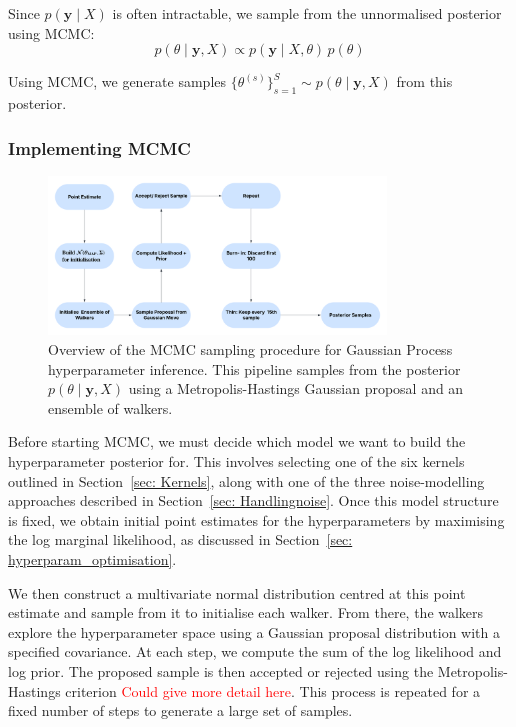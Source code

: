 \documentclass{article}
\begin{document}
\noindent
Since \( p(\mathbf{y} \mid X) \) is often intractable, we sample from the unnormalised posterior using MCMC:
\[
p(\theta \mid \mathbf{y}, X) \propto p(\mathbf{y} \mid X, \theta) \, p(\theta)
\]

\noindent
Using MCMC, we generate samples \( \{\theta^{(s)}\}_{s=1}^S \sim p(\theta \mid \mathbf{y}, X) \) from this posterior.


\subsubsection*{Implementing MCMC}
\begin{figure}[H]
    \centering
    \includegraphics[width=0.8\textwidth]{LatexPlots/MCMC_Flow.png}
    \caption{Overview of the MCMC sampling procedure for Gaussian Process hyperparameter inference.
     This pipeline samples from the posterior \( p(\theta \mid \mathbf{y}, X) \) using a Metropolis-Hastings Gaussian proposal and an ensemble of walkers.}
    \label{fig:MCMC flowchart}
\end{figure}

\noindent
Before starting MCMC, we must decide which model we want to build the hyperparameter posterior for. This involves selecting one of the six kernels outlined in Section~\ref{sec: Kernels}, along with one of the three noise-modelling approaches described in Section~\ref{sec: Handlingnoise}. Once this model structure is fixed, we obtain initial point estimates for the hyperparameters by maximising the log marginal likelihood, as discussed in Section~\ref{sec: hyperparam_optimisation}.

\noindent
We then construct a multivariate normal distribution centred at this point estimate and sample from it to initialise each walker. From there, the walkers explore the hyperparameter space using a Gaussian proposal distribution with a specified covariance. At each step, we compute the sum of the log likelihood and log prior. The proposed sample is then accepted or rejected using the Metropolis-Hastings criterion \textcolor{red}{Could give more detail here}. This process is repeated for a fixed number of steps to generate a large set of samples.
\end{document}
